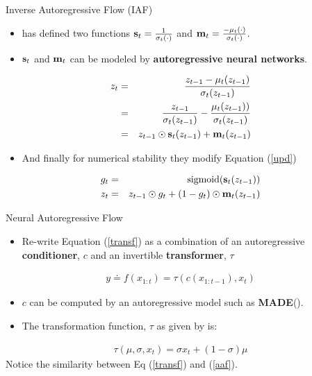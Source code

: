 \documentclass{beamer}
\begin{document}
\begin{frame}{Inverse Autoregressive Flow (IAF)}
\begin{itemize}
    \item \cite{kingma2016improved} has defined two functions ${\bf s}_t = \frac{1}{\sigma_t(\cdot)}$ and ${\bf m}_t = \frac{-\mu_t(\cdot)}{\sigma_t(\cdot)}$.
    \item ${\bf s}_t$ and ${\bf m}_t$ can be modeled by \textbf{autoregressive neural networks}.
\end{itemize}
\begin{eqnarray}
z_t &=& \frac{z_{t-1} - \mu_t(z_{t-1}) }{\sigma_t(z_{t-1})} \\
    &=& \frac{z_{t-1}}{\sigma_t(z_{t-1})} - \frac{\mu_t(z_{t-1})) }{\sigma_t(z_{t-1}) } \\
    &=& z_{t-1} \odot {\bf s}_t(z_{t-1})  + {\bf m}_t (z_{t-1}) \label{upd}
\end{eqnarray}
\pause
\begin{itemize}
    \item And finally for numerical stability they modify Equation (\ref{upd})
\end{itemize}
\begin{eqnarray}
g_t &=& \text{sigmoid}({\bf s}_t(z_{t-1}))  \\
z_t &=& z_{t-1} \odot g_t  + (1 - g_t) \odot {\bf m}_t (z_{t-1}) \label{transf}
\end{eqnarray}
\end{frame}
\begin{frame}{Neural Autoregressive Flow}
\begin{itemize}
    \item Re-write Equation (\ref{transf}) as a combination of an autoregressive \textbf{conditioner}, $c$ and an invertible \textbf{transformer}, $\tau$
\end{itemize}
\begin{eqnarray}
y \doteq f(x_{1:t}) = \tau(c(x_{1:t-1}),x_t)
\end{eqnarray}
\pause
\begin{itemize}
    \item $c$ can be computed by an autoregressive model such as \textbf{MADE}(\cite{germain2015made}). 
    \pause
    \item The transformation function, $\tau$ as given by \cite{kingma2016improved} is:
\end{itemize}
\begin{eqnarray}
\tau(\mu, \sigma, x_t) = \sigma x_t + (1-\sigma)\mu \label{aaf}
\end{eqnarray}
\pause
Notice the similarity between Eq (\ref{transf}) and (\ref{aaf}).
\end{frame}
\end{document}
